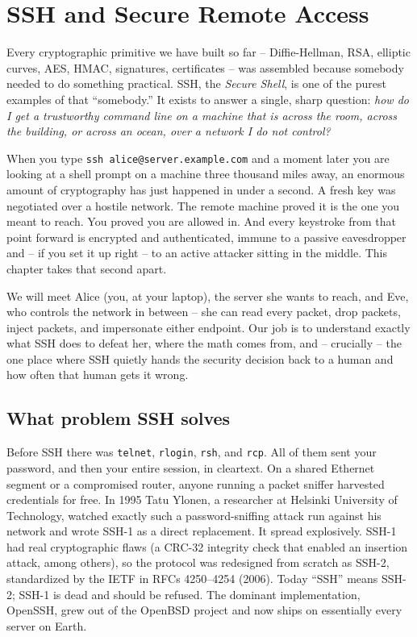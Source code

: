\chapter{SSH and Secure Remote Access}

Every cryptographic primitive we have built so far -- Diffie-Hellman, RSA, elliptic curves, AES, HMAC, signatures, certificates -- was assembled because somebody needed to do something practical. SSH, the \emph{Secure Shell}, is one of the purest examples of that ``somebody.'' It exists to answer a single, sharp question: \emph{how do I get a trustworthy command line on a machine that is across the room, across the building, or across an ocean, over a network I do not control?}

When you type \texttt{ssh alice@server.example.com} and a moment later you are looking at a shell prompt on a machine three thousand miles away, an enormous amount of cryptography has just happened in under a second. A fresh key was negotiated over a hostile network. The remote machine proved it is the one you meant to reach. You proved you are allowed in. And every keystroke from that point forward is encrypted and authenticated, immune to a passive eavesdropper and -- if you set it up right -- to an active attacker sitting in the middle. This chapter takes that second apart.

We will meet Alice (you, at your laptop), the server she wants to reach, and Eve, who controls the network in between -- she can read every packet, drop packets, inject packets, and impersonate either endpoint. Our job is to understand exactly what SSH does to defeat her, where the math comes from, and -- crucially -- the one place where SSH quietly hands the security decision back to a human and how often that human gets it wrong.

\section{What problem SSH solves}

\begin{historybox}
Before SSH there was \texttt{telnet}, \texttt{rlogin}, \texttt{rsh}, and \texttt{rcp}. All of them sent your password, and then your entire session, in cleartext. On a shared Ethernet segment or a compromised router, anyone running a packet sniffer harvested credentials for free. In 1995 Tatu Ylonen, a researcher at Helsinki University of Technology, watched exactly such a password-sniffing attack run against his network and wrote SSH-1 as a direct replacement. It spread explosively. SSH-1 had real cryptographic flaws (a CRC-32 integrity check that enabled an insertion attack, among others), so the protocol was redesigned from scratch as SSH-2, standardized by the IETF in RFCs 4250--4254 (2006). Today ``SSH'' means SSH-2; SSH-1 is dead and should be refused. The dominant implementation, OpenSSH, grew out of the OpenBSD project and now ships on essentially every server on Earth.
\end{historybox}

